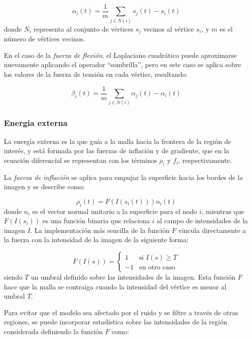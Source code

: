%
\begin{equation}
\alpha_{i}(t) = \dfrac{1}{m}\sum_{j\in N(i)} s_{j}(t) - s_{i}(t)
\end{equation}
%
donde $N_{i}$ representa al conjunto de vértices $s_{j}$ vecinos al vértice $s_{i}$, y $m$ es el número de vértices  vecinos.

En el caso de la \emph{fuerza de flexión}, el Laplaciano cuadrático puede aproximarse nuevamente aplicando el operador “sombrilla”, pero en este caso se aplica sobre los valores de la fuerza de tensión en cada vértice, resultando:

%
\begin{equation}
\beta_{i}(t) = \dfrac{1}{m} \sum_{j\in N(i)} \alpha_{j}(t) - \alpha_{i}(t)
\end{equation}
%
\subsubsection{Energia externa}\label{section:energia_externa}
La energía externa es la que guía a la malla hacia la frontera de la región de interés, y está formada por las fuerzas de inflación y de gradiente, que en la ecuación diferencial se representan con los términos $\rho_{i}$ y $f_{i}$, respectivamente.

La \emph{fuerza de inflación} se aplica para empujar la superficie hacia los bordes de la imagen y se describe como: 

%
\begin{equation}
\rho_{i}(t) = F(I(s_{i}(t))) n_{i}(t)
\end{equation}
%
donde $n_{i}$ es el vector normal unitario a la superficie para el nodo $i$, mientras que $F(I(s_{i}))$ es una función binaria que relaciona $i$ al campo de intensidades de la imagen $I$. La implementación más sencilla de la función $F$ vincula directamente a la fuerza con la intensidad de la imagen de la siguiente forma:

%
\begin{equation}
F(I(s)) = \begin{cases} 1 & \text{si } I(s) \geq T \\ -1 & \text{en otro caso} \end{cases}
\end{equation}
%
siendo $T$ un umbral definido sobre las intensidades de la imagen. Esta función $F$ hace que la malla se contraiga cuando la intensidad del vértice es menor al umbral $T$.

Para evitar que el modelo sea afectado por el ruido y se filtre a través de otras regiones, se puede incorporar estadística sobre las intensidades de la región considerada \citep{ivins1994statistical} definiendo la función $F$ como:

